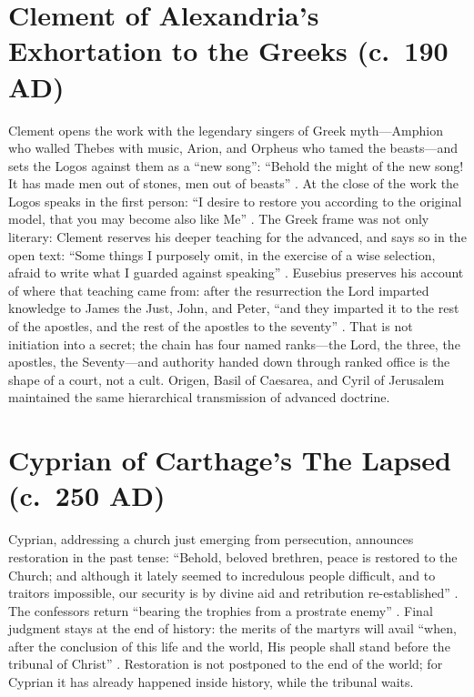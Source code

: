 \section{Clement of Alexandria's Exhortation to the Greeks (c.~190 AD)}\label{sec:clement-of-alexandrias-exhortation-to-the-greeks-c.-190-ad}

Clement opens the work with the legendary singers of Greek myth---Amphion who walled Thebes with music, Arion, and Orpheus who tamed the beasts---and sets the Logos against them as a ``new song'': ``Behold the might of the new song! It has made men out of stones, men out of beasts'' \cite[Chapter 1]{clement:exhortation}.
At the close of the work the Logos speaks in the first person: ``I desire to restore you according to the original model, that you may become also like Me'' \cite[Chapter 12]{clement:exhortation}.
The Greek frame was not only literary: Clement reserves his deeper teaching for the advanced, and says so in the open text: ``Some things I purposely omit, in the exercise of a wise selection, afraid to write what I guarded against speaking'' \cite[1.1]{clement:stromata}.
Eusebius preserves his account of where that teaching came from: after the resurrection the Lord imparted knowledge to James the Just, John, and Peter, ``and they imparted it to the rest of the apostles, and the rest of the apostles to the seventy'' \cite[2.1.4]{eusebius:he}.
That is not initiation into a secret; the chain has four named ranks---the Lord, the three, the apostles, the Seventy---and authority handed down through ranked office is the shape of a court, not a cult.
Origen, Basil of Caesarea, and Cyril of Jerusalem maintained the same hierarchical transmission of advanced doctrine.

\section{Cyprian of Carthage's The Lapsed (c.~250 AD)}\label{sec:cyprian-of-carthages-the-lapsed-c.-250-ad}

Cyprian, addressing a church just emerging from persecution, announces restoration in the past tense: ``Behold, beloved brethren, peace is restored to the Church; and although it lately seemed to incredulous people difficult, and to traitors impossible, our security is by divine aid and retribution re-established'' \cite[1]{cyprian:lapsed}.
The confessors return ``bearing the trophies from a prostrate enemy'' \cite[2]{cyprian:lapsed}.
Final judgment stays at the end of history: the merits of the martyrs will avail ``when, after the conclusion of this life and the world, His people shall stand before the tribunal of Christ'' \cite[17]{cyprian:lapsed}.
Restoration is not postponed to the end of the world; for Cyprian it has already happened inside history, while the tribunal waits.
